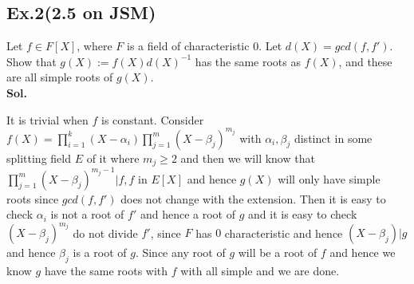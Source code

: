 \documentclass[lang=en,11pt,a4paper,citestyle =authoryear]{elegantpaper}
\begin{document}
\subsection*{Ex.2(2.5 on JSM)}
Let $f\in F[X]$, where $F$ is a field of characteristic $0$. Let $d(X) = gcd(f,f')$. Show that $g(X):=f(X)d(X)^{-1}$ has the same roots as $f(X)$, and these are all simple roots of $g(X)$.
\vspace{0.5em}\\
\textbf{Sol.} \par
\iffalse
Since char$(F)=0$, $F$ is perfect.  Clearly, all roots of $g(x)$ are roots of $f(x)$. 

Notice that in the splitting field of $f=\prod_{i=1}^k(x-x_i)^{n_i}$, we have $f'=\sum_{i=1}^k n_i\frac{f(x)}{x-x_i}$, so $\gcd(f,f')=\prod_{n_i>1}(x-x_i)^{n_i-1}$. By comparing the roots, we see every root of $f(x)$ will be a root of $g(x)$, and every root of $g(x)$ has single multiplicity because its degree is 1.
\fi
It is trivial when $f$ is constant. Consider $f(X) = \prod_{i=1}^k (X-\alpha_i)\prod_{j=1}^m (X-\beta_j)^{m_j}$ with $\alpha_i,\beta_j$ distinct in some splitting field $E$ of it where $m_j \geq 2$ and then we will know that $\prod_{j=1}^m (X-\beta_j)^{m_j-1}| f,f$ in $E[X]$ and hence $g(X)$ will only have simple roots since $gcd(f,f')$ does not change with the extension. Then it is easy to check $\alpha_i$ is not a root of $f'$ and hence a root of $g$ and it is easy to check $(X-\beta_j)^{m_j}$ do not divide $f'$, since $F$ has $0$ characteristic and hence $(X-\beta_j)|g$ and hence $\beta_j$ is a root of $g$. Since any root of $g$ will be a root of $f$ and hence we know $g$ have the same roots with $f$ with all simple and we are done.
\par 
\vspace{0.5em}
\end{document}
